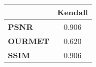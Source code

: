 \begin{tabular}{|l|c|}
\hline
&\textbf{Kendall}\\\hline
\textbf{PSNR}&0.906\\\hline
\textbf{OURMET}&0.620\\\hline
\textbf{SSIM}&0.906\\\hline
\end{tabular}
